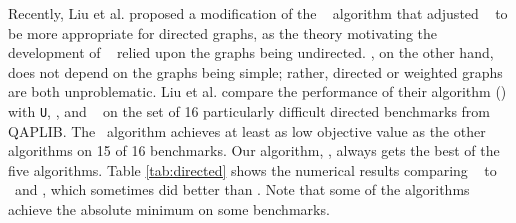 \documentclass[preprint,11pt]{elsarticle}
\begin{document}
Recently, Liu et al. \cite{Liu2012} proposed a modification of the \Path~ algorithm that adjusted \Path~ to be more appropriate for directed graphs, as the theory motivating the development of \Path~ relied upon the graphs being undirected.  \FAQ, on the other hand, does not depend on the graphs being simple; rather, directed or weighted graphs are both unproblematic. 
Liu et al. compare the performance of their algorithm (\Epath) with \texttt{U}, \Qcv, and \Grad~ on the set of 16 particularly difficult directed benchmarks from QAPLIB.  The \Epath~algorithm achieves at least as low objective value as the other algorithms on 15 of 16 benchmarks.  Our algorithm, \FAQ, always gets the best of the five algorithms.  Table \ref{tab:directed} shows the numerical results comparing \FAQ~ to \Epath~and \Grad, which sometimes did better than \Epath.  Note that some of the algorithms achieve the absolute minimum on some benchmarks.  
\end{document}
